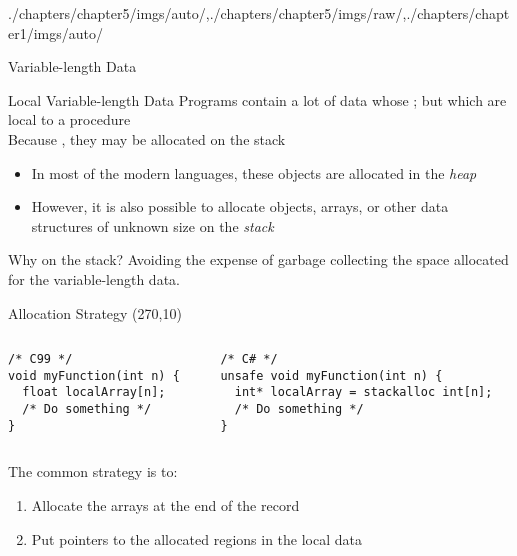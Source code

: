 \begin{graphicspathcontext}{{./chapters/chapter5/imgs/auto/},{./chapters/chapter5/imgs/raw/},{./chapters/chapter1/imgs/auto/}}
\begin{bibunit}[apalike]
\begin{frame}{Variable-length Data}
	\begin{block}{Local Variable-length Data}
		Programs contain a lot of data whose ; but which are local to a procedure \\[.2cm]
		Because , they may be allocated on the stack
	\end{block}
	\vspace{.25cm}
	\begin{itemize}
		\item In most of the modern languages, these objects are allocated in the \emph{heap}
		\item However, it is also possible to allocate objects, arrays, or other data structures of unknown size on the \emph{stack}
	\end{itemize}
	\vspace{.5cm}
	\begin{block}{Why on the stack?}
		Avoiding the expense of garbage collecting the space allocated for the variable-length data.
	\end{block}
\end{frame}

\begin{frame}[t,fragile]{Allocation Strategy}
	\putat(270,10){}
	\begin{columns}
		\begin{column}{.4\linewidth}
			\begin{lstlisting}[style=lststyle-c]
/* C99 */
void myFunction(int n) {
  float localArray[n];
  /* Do something */
}
			\end{lstlisting}
		\end{column}
		\begin{column}{.5\linewidth}
			\begin{lstlisting}[style=lststyle-csharp]
/* C# */
unsafe void myFunction(int n) {
  int* localArray = stackalloc int[n];
  /* Do something */
}
			\end{lstlisting}
		\end{column}
	\end{columns}
	\begin{minipage}{.6\linewidth}
		The common strategy is to:
		\begin{enumerate}
			\item Allocate the arrays at the end of the record
			\item Put pointers to the allocated regions in the local data
		\end{enumerate}
	\end{minipage} \\[2cm]
\end{frame}


\end{bibunit}
\end{graphicspathcontext}
